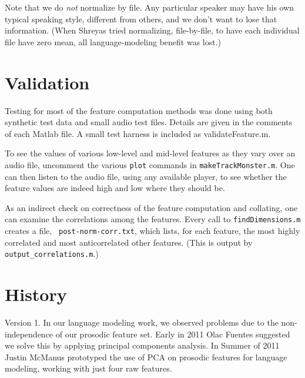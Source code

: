\documentclass[11pt]{article}
\begin{document}

Note that we do {\em not} normalize by file.  Any particular speaker
may have his own typical speaking style, different from others, and we
don't want to lose that information.  (When Shreyas tried normalizing,
file-by-file, to have each individual file have zero mean, all
language-modeling benefit was lost.)



\section{Validation}

Testing for most of the feature computation methods was done using
both synthetic test data and small audio test files.  Details are
given in the comments of each Matlab file.  A small test harness is
included as validateFeature.m.

To see the values of various low-level and mid-level features as they
vary over an audio file, uncomment the various {\tt plot} commands in
{\tt makeTrackMonster.m}.  One can then listen to the audio file,
using any available player, to see whether the feature values are
indeed high and low where they should be.

As an indirect check on correctness of the feature computation and
collating, one can examine the correlations among the features.  Every
call to {\tt findDimensions.m} creates a file, {\tt
  post-norm-corr.txt}, which lists, for each feature, the most highly
correlated and most anticorrelated other features.  (This is output by
{\tt output\_correlations.m}.)


\section{History}

Version 1.  In our language  modeling work, we observed
problems due to the non-independence of our prosodic feature set.
Early in 2011 Olac Fuentes suggested we solve this by applying
principal components analysis.  In Summer of 2011 Justin McManus
prototyped the use of PCA on prosodic features for language modeling,
working with just four raw features.
\end{document}
